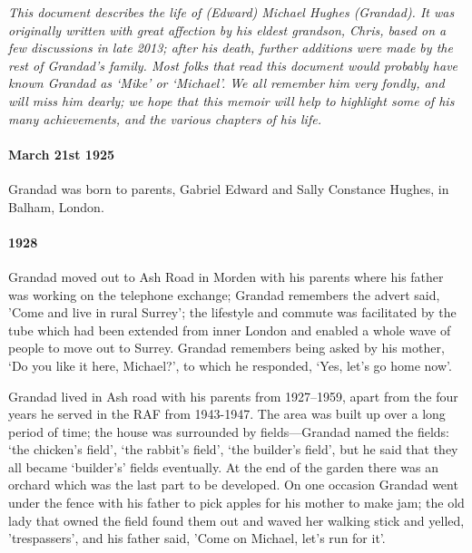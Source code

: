 %
{\itshape This document describes the life of (Edward) Michael Hughes (Grandad). It was
	originally written with great affection by his eldest grandson, Chris, based on a few discussions in late 2013; after
	his death, further additions were made by the rest of Grandad's family. Most folks that read this
	document would probably have known Grandad as `Mike' or `Michael'. We all remember him very fondly, and will
	miss him dearly; we hope that this memoir will help to highlight some of his many achievements, and the
various chapters of his life.}

\paragraph{March 21st 1925} Grandad was born to parents, Gabriel Edward and Sally Constance Hughes, in Balham, London.
\paragraph{1928} Grandad moved out to Ash Road in Morden with his parents where his father was working on the telephone exchange;
Grandad remembers the advert said, 'Come and live in rural Surrey'; the lifestyle and commute was facilitated
by the tube which had been extended from inner London and enabled a whole
wave of people to move out to Surrey. Grandad remembers being asked by
his mother, `Do you like it here, Michael?', to which he responded, `Yes, let's go home now'.

Grandad lived in Ash road with his parents from 1927--1959, apart from the four years he served
in the RAF from 1943-1947.  The area was built up over a long period of time;
the house was surrounded by fields---Grandad named the fields: `the chicken's field',
`the rabbit's field', `the builder's field', but he said that they all became `builder's'
fields eventually. At the end of the garden there
was an orchard which was the last part to be developed. On one occasion Grandad went under the
fence with his father to pick apples for his mother to make jam; the old lady that owned the field
found them out and waved her walking stick and yelled, 'trespassers', and his
father said, 'Come on Michael, let's run for it'.

